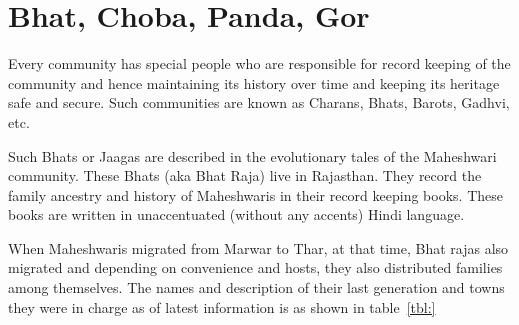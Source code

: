 \chapter{Bhat, Choba, Panda, Gor}
Every community has special people who are responsible for record keeping of
the community and hence maintaining its history over time and keeping its
heritage safe and secure. Such communities are known as Charans, Bhats, Barots,
Gadhvi, etc.

Such Bhats or Jaagas are described in the evolutionary tales of the Maheshwari
community. These Bhats (aka Bhat Raja) live in Rajasthan. They record the
family ancestry and history of Maheshwaris in their record keeping books. These
books are written in unaccentuated (without any accents) Hindi language.

When Maheshwaris migrated from Marwar to Thar, at that time, Bhat rajas also
migrated and depending on convenience and hosts, they also distributed families
among themselves. The names and description of their last generation and towns
they were in charge as of latest information is as shown in table~\ref{tbl:}


